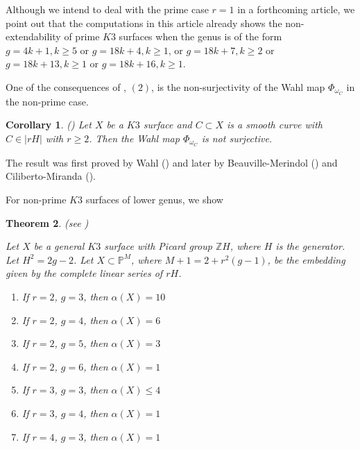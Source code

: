 \documentclass[11pt,twoside]{amsart}
\theoremstyle{plain}
\numberwithin{equation}{section}
\newtheorem{theorem}{Theorem}[section]
\newtheorem{corollary}[theorem]{Corollary}
\theoremstyle{definition}
\begin{document}
 \par


Although we intend to deal with the prime case $r=1$ in a forthcoming article, we point out that the computations in this article already shows the non-extendability of prime $K3$ surfaces when the genus is of the form $g = 4k+1, k \geq 5$ or $g = 18k+4, k \geq 1$, or $g = 18k+7, k \geq 2$ or $g = 18k+13, k \geq 1$ or $g = 18k+16, k \geq 1$.
\vspace{0.2cm}

\color{black}

One of the consequences of , $(2)$, is the non-surjectivity of the Wahl map $\Phi_{\omega_C}$ in the non-prime case.

\begin{corollary}\label{Wahl intro}()
 Let $X$ be a $K3$ surface and $C \subset X$ is a smooth curve with $C \in |rH|$ with $r \geq 2$. Then the Wahl map $\Phi_{\omega_C}$ is not surjective. 
\end{corollary}

The result was first proved by Wahl (\cite{W87}) and later by Beauville-Merindol (\cite{BM87}) and Ciliberto-Miranda (\cite{CM90}).

\color{black}


For non-prime $K3$ surfaces of lower genus, we show 

\begin{theorem}(see )\label{ZL for lower genus $K3$ surfaces intro}

Let $X$ be a general $K3$ surface with Picard group $\mathbb{Z}H$, where $H$ is the generator. Let $H^2 = 2g-2$. Let $X \subset \mathbb{P}^M$, where $M+1 = 2+r^2(g-1)$, be the embedding given by the complete linear series of $rH$. 
    \begin{enumerate}
        \item If $r = 2$, $g = 3$, then $\alpha(X) = 10$ 
        \item If $r = 2$, $g = 4$, then $\alpha(X) = 6$ 
        \item If $r = 2$, $g = 5$, then $\alpha(X) = 3$ 
        \item If $r = 2$, $g = 6$, then $\alpha(X) = 1$ 
        \item If $r = 3$, $g = 3$, then $\alpha(X) \leq 4$
        \item If $r = 3$, $g = 4$, then $\alpha(X) = 1$ 
        \item If $r = 4$, $g = 3$, then $\alpha(X) = 1$
        
       
        
    \end{enumerate}
    
\end{theorem}
\end{document}
